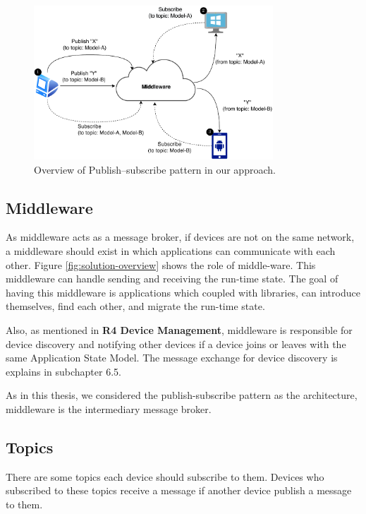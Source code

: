 \vspace{10mm}
\FloatBarrier \begin{figure}[H]
    \includegraphics[width=0.8\textwidth]{../figures/publish-subscribe.pdf}
    \centering
    \caption{Overview of Publish–subscribe pattern in our approach.}
    \label{fig:publish–subscribe}
\end{figure} \FloatBarrier

\subsection{Middleware}
As middleware acts as a message broker, if devices are not on the same network, a middleware should exist in which applications can communicate with each other. Figure \ref{fig:solution-overview} shows the role of middle-ware.
This middleware can handle sending and receiving the run-time state.
The goal of having this middleware is applications which coupled with
libraries, can introduce themselves, find each other, and migrate the run-time state.

Also, as mentioned in \textbf{R4 Device Management}, middleware is responsible for device discovery and notifying other devices if a device joins or leaves with the same Application State Model. The message exchange for device discovery is explains in subchapter 6.5.

As in this thesis, we considered the publish-subscribe pattern as the architecture, middleware is the intermediary message broker.

\subsection{Topics}
There are some topics each device should subscribe to them. Devices who subscribed to these topics receive a message if another device publish a message to them.

